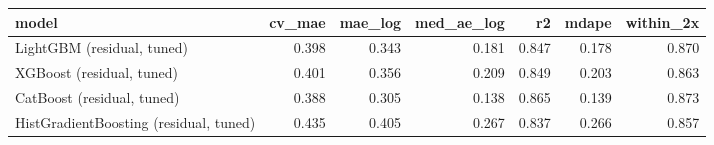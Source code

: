 \begin{tabular}{lrrrrrr}
\toprule
model & cv_mae & mae_log & med_ae_log & r2 & mdape & within_2x \\
\midrule
LightGBM (residual, tuned) & 0.398 & 0.343 & 0.181 & 0.847 & 0.178 & 0.870 \\
XGBoost (residual, tuned) & 0.401 & 0.356 & 0.209 & 0.849 & 0.203 & 0.863 \\
CatBoost (residual, tuned) & 0.388 & 0.305 & 0.138 & 0.865 & 0.139 & 0.873 \\
HistGradientBoosting (residual, tuned) & 0.435 & 0.405 & 0.267 & 0.837 & 0.266 & 0.857 \\
\bottomrule
\end{tabular}

